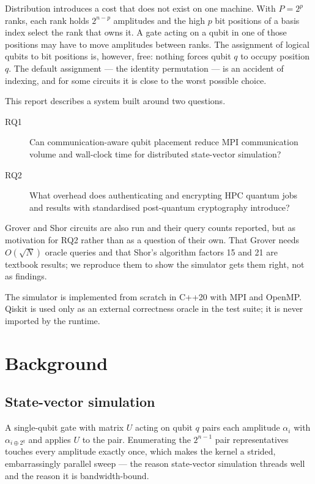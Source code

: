\documentclass[11pt]{article}
\begin{document}
Distribution introduces a cost that does not exist on one machine.
With $P = 2^p$ ranks, each rank holds $2^{n-p}$ amplitudes and the high $p$
bit positions of a basis index select the rank that owns it. A gate acting on a
qubit in one of those positions may have to move amplitudes between ranks. The
assignment of logical qubits to bit positions is, however, free: nothing forces
qubit $q$ to occupy position $q$. The default assignment --- the identity
permutation --- is an accident of indexing, and for some circuits it is close
to the worst possible choice.

This report describes a system built around two questions.

\begin{description}
\item[RQ1] Can communication-aware qubit placement reduce MPI communication
  volume and wall-clock time for distributed state-vector simulation?
\item[RQ2] What overhead does authenticating and encrypting HPC quantum jobs
  and results with standardised post-quantum cryptography introduce?
\end{description}

Grover and Shor circuits are also run and their query counts reported, but as
motivation for RQ2 rather than as a question of their own. That Grover needs
$O(\sqrt{N})$ oracle queries and that Shor's algorithm factors 15 and 21 are
textbook results; we reproduce them to show the simulator gets them right,
not as findings.

The simulator is implemented from scratch in C++20 with MPI and OpenMP.
Qiskit \cite{qiskit} is used only as an external correctness oracle in the test
suite; it is never imported by the runtime.

\section{Background}

\subsection{State-vector simulation}

A single-qubit gate with matrix $U$ acting on qubit $q$ pairs each amplitude
$\alpha_i$ with $\alpha_{i \oplus 2^q}$ and applies $U$ to the pair. Enumerating
the $2^{n-1}$ pair representatives touches every amplitude exactly once, which
makes the kernel a strided, embarrassingly parallel sweep --- the reason
state-vector simulation threads well and the reason it is bandwidth-bound.
\end{document}

